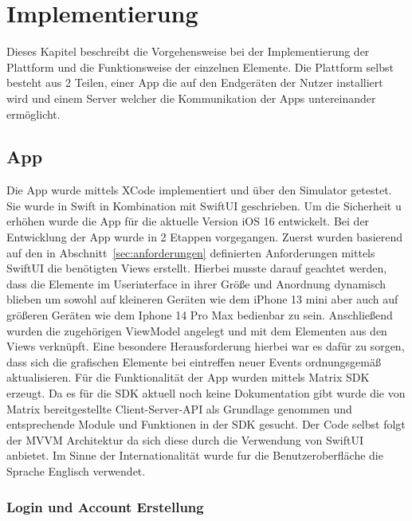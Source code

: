     \newpage
    \chapter{Implementierung}\label{ch:implementierung}
    Dieses Kapitel beschreibt die Vorgehensweise bei der Implementierung der Plattform und die Funktionsweise der einzelnen Elemente.
    Die Plattform selbst besteht aus 2 Teilen, einer App die auf den Endgeräten der Nutzer installiert wird und einem Server welcher die Kommunikation der Apps untereinander ermöglicht.


    \section{App}\label{sec:app}
    Die App wurde mittels XCode implementiert und über den Simulator getestet.
    Sie wurde in Swift in Kombination mit SwiftUI geschrieben.
    Um die Sicherheit u erhöhen wurde die App für die aktuelle Version iOS 16 entwickelt.
    Bei der Entwicklung der App wurde in 2 Etappen vorgegangen.
    Zuerst wurden basierend auf den in Abschnitt~\ref{sec:anforderungen} definierten Anforderungen mittels SwiftUI die benötigten Views erstellt.
    Hierbei musste darauf geachtet werden, dass die Elemente im Userinterface in ihrer Größe und Anordnung dynamisch blieben um sowohl auf kleineren Geräten wie dem iPhone 13 mini aber auch auf größeren Geräten wie dem Iphone 14 Pro Max bedienbar zu sein.
    Anschließend wurden die zugehörigen ViewModel angelegt und mit dem Elementen aus den Views verknüpft.
    Eine besondere Herausforderung hierbei war es dafür zu sorgen, dass sich die grafischen Elemente bei eintreffen neuer Events ordnungsgemäß aktualisieren.
    Für die Funktionalität der App wurden mittels Matrix SDK erzeugt.
    Da es für die SDK aktuell noch keine Dokumentation gibt wurde die von Matrix bereitgestellte Client-Server-API als Grundlage genommen und entsprechende Module und Funktionen in der SDK gesucht.
    Der Code selbst folgt der MVVM Architektur da sich diese durch die Verwendung von SwiftUI anbietet.
    Im Sinne der Internationalität wurde fur die Benutzeroberfläche die Sprache Englisch verwendet.

    \newpage
    \subsection{Login und Account Erstellung}\label{subsec:login-und-account-erstellung}

